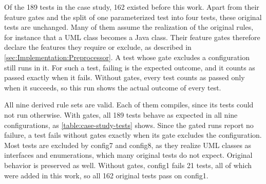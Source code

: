 Of the 189 tests in the case study, 162 existed before this work.
Apart from their feature gates and the split of one parameterized test into four tests, these original tests are unchanged.
Many of them assume the realization of the original rules, for instance that a UML class becomes a Java class.
Their feature gates therefore declare the features they require or exclude, as described in \autoref{sec:Implementation:Preprocessor}.
A test whose gate excludes a configuration still runs in it.
For such a test, failing is the expected outcome, and it counts as passed exactly when it fails.
Without gates, every test counts as passed only when it succeeds, so this run shows the actual outcome of every test.

All nine derived rule sets are valid.
Each of them compiles, since its tests could not run otherwise.
With gates, all 189 tests behave as expected in all nine configurations, as \autoref{table:case-study-tests} shows.
Since the gated runs report no failure, a test fails without gates exactly when its gate excludes the configuration.
Most tests are excluded by config7 and config8, as they realize UML classes as interfaces and enumerations, which many original tests do not expect.
Original behavior is preserved as well.
Without gates, config1 fails 21 tests, all of which were added in this work, so all 162 original tests pass on config1.

